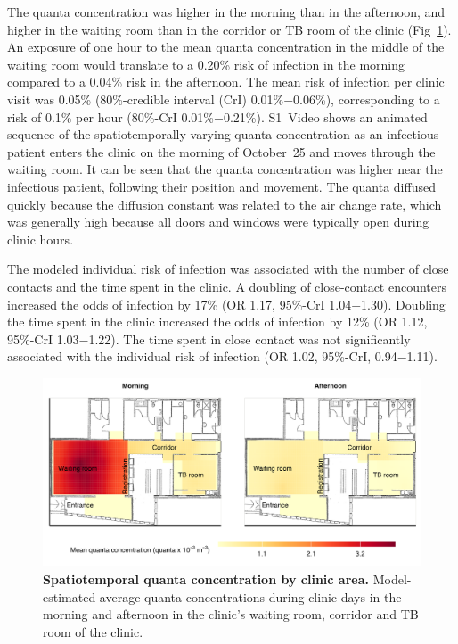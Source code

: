 \documentclass[fleqn,11pt]{wlscirep}
\begin{document}
The quanta concentration was higher in the morning than in the afternoon, and higher in the waiting room than in the corridor or TB room of the clinic (Fig~\ref{fig:main-modeling-results}). An exposure of one hour to the mean quanta concentration in the middle of the waiting room would translate to a 0.20\% risk of infection in the morning compared to a 0.04\% risk in the afternoon. The mean risk of infection per clinic visit was 0.05\% (80\%-credible interval (CrI) 0.01\%$-$0.06\%), corresponding to a risk of 0.1\% per hour (80\%-CrI 0.01\%$-$0.21\%). S1~Video shows an animated sequence of the spatiotemporally varying quanta concentration as an infectious patient enters the clinic on the morning of October~25 and moves through the waiting room. It can be seen that the quanta concentration was higher near the infectious patient, following their position and movement. The quanta diffused quickly because the diffusion constant was related to the air change rate, which was generally high because all doors and windows were typically open during clinic hours.

The modeled individual risk of infection was associated with the number of close contacts and the time spent in the clinic. A doubling of close-contact encounters increased the odds of infection by 17\% (OR 1.17, 95\%-CrI 1.04$-$1.30). Doubling the time spent in the clinic increased the odds of infection by 12\% (OR 1.12, 95\%-CrI 1.03$-$1.22). The time spent in close contact was not significantly associated with the individual risk of infection (OR 1.02, 95\%-CrI, 0.94$-$1.11). 

\begin{figure}
    \centering
    \includegraphics{results/modeling/mean-quanta-concentration.png}
    \caption{\textbf{Spatiotemporal quanta concentration by clinic area.} Model-estimated average quanta concentrations during clinic days in the morning and afternoon in the clinic's waiting room, corridor and TB room of the clinic.}
    \label{fig:main-modeling-results}
\end{figure}
\end{document}
